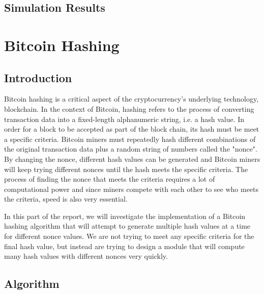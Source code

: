 \documentclass{article}
\begin{document}



\subsection{Simulation Results}




\newpage
\section{Bitcoin Hashing}

\subsection{Introduction}


Bitcoin hashing is a critical aspect of the cryptocurrency's underlying technology, blockchain. In the context of Bitcoin, hashing refers to the process of converting transaction data into a fixed-length alphanumeric string, i.e. a hash value. In order for a block to be accepted as part of the block chain, its hash must be meet a specific criteria. Bitcoin miners must repeatedly hash different combinations of the original transaction data plus a random string of numbers called the "nonce". By changing the nonce, different hash values can be generated and Bitcoin miners will keep trying different nonces until the hash meets the specific criteria. The process of finding the nonce that meets the criteria requires a lot of computational power and since miners compete with each other to see who meets the criteria, speed is also very essential.

In this part of the report, we will investigate the implementation of a Bitcoin hashing algorithm that will attempt to generate multiple hash values at a time for different nonce values. We are not trying to meet any specific criteria for the final hash value, but instead are trying to design a module that will compute many hash values with different nonces very quickly.

\subsection{Algorithm}
\end{document}
